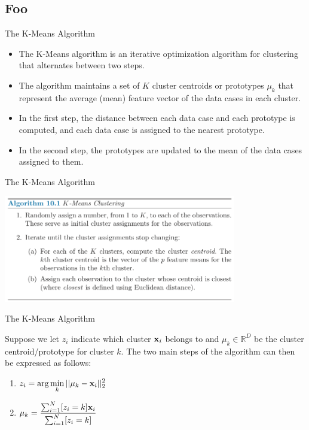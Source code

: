 \documentclass[serif,xcolor=pdftex,dvipsnames,table,hyperref={bookmarks=false,breaklinks}]{beamer}
\begin{document}
\subsection{Foo}

\begin{frame}[t]{The K-Means Algorithm}
 
\begin{itemize}
\item The K-Means algorithm is an iterative optimization 
algorithm for clustering that alternates between two steps.

\pause \item The algorithm maintains a set of $K$ cluster centroids  or 
prototypes $\mu_k$ that represent the average (mean) feature vector of the data 
cases in each cluster.

\pause\item In the first step, the distance between each data case and each 
prototype is computed, and each data case is assigned to the nearest prototype.

\pause\item In the second step, the prototypes are updated to the mean of the 
data cases assigned to them.

\end{itemize} 
\end{frame}

\begin{frame}[t]{The K-Means Algorithm}

\center
\includegraphics[width=4in]{../Figures/kmeans-algorithm.png}

\end{frame}

\begin{frame}[t]{The K-Means Algorithm}

Suppose we let $z_i$ indicate which cluster ${\mathbf{x}}_i$ belongs to and 
$\mu_k\in \mathbb{R}^D$ be the cluster centroid/prototype for cluster $k$.
The two main steps of the algorithm can then be expressed as follows:

\begin{enumerate}
\item $\displaystyle z_i =\arg\min_k ||\mu_k-{\mathbf{x}}_i||_2^2$

\item $\displaystyle \mu_k = \frac{\sum_{i=1}^N [z_i=k]{\mathbf{x}}_i}{\sum_{i=1}^N 
[z_i=k]}$

\end{enumerate}

\end{frame}
\end{document}
